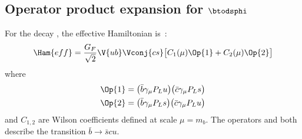 


\subsection[Operator product expansion for \btodsphi]
{Operator product expansion for $\boldsymbol{\btodsphi}$}

For the decay \btodsphi, the effective Hamiltonian
is~\cite{Zou:2009zza,Mohanta:2002wf,PhysRevD.76.057701,Lu:2001yz}:
\begin{equation}
  \Ham{eff}=
  \frac{G_F}{\sqrt{2}} \V{ub}\Vconj{cs}
  \big[
    C_1(\mu)\Op{1}+C_2(\mu)\Op{2}
    \big]
\end{equation}
where
\begin{align}
  \Op{1} &= \big(\bar b\gamma_\mu P_Lu\big) \big(\bar c\gamma_\mu P_Ls\big) \nonumber\\
  \Op{2} &= \big(\bar b\gamma_\mu P_Ls\big) \big(\bar c\gamma_\mu P_Lu\big)
\end{align}
and $C_{1,2}$ are Wilson coefficients defined at scale $\mu=m_b$.
The operators  and  both describe the transition $\bar b\!\to\bar scu$.





